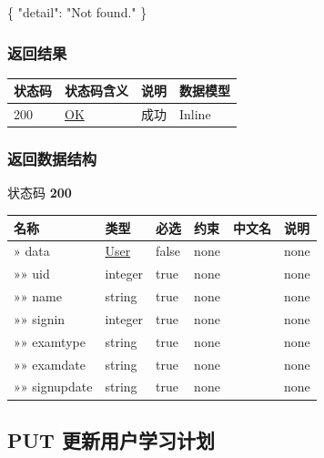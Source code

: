 \documentclass[
]{article}
\newenvironment{Shaded}{}{}
\newcommand{\DataTypeTok}[1]{\textcolor[rgb]{0.56,0.13,0.00}{#1}}
\newcommand{\FunctionTok}[1]{\textcolor[rgb]{0.02,0.16,0.49}{#1}}
\newcommand{\StringTok}[1]{\textcolor[rgb]{0.25,0.44,0.63}{#1}}
\begin{document}
\begin{Shaded}
\begin{Highlighting}[]
\FunctionTok{\{}
  \DataTypeTok{"detail"}\FunctionTok{:} \StringTok{"Not found."}
\FunctionTok{\}}
\end{Highlighting}
\end{Shaded}

\hypertarget{ux8fd4ux56deux7ed3ux679c-26}{%
\subsubsection{返回结果}\label{ux8fd4ux56deux7ed3ux679c-26}}

\begin{longtable}[]{@{}llll@{}}
\toprule
状态码 & 状态码含义 & 说明 & 数据模型 \\
\midrule
\endhead
200 & \href{https://tools.ietf.org/html/rfc7231\#section-6.3.1}{OK} &
成功 & Inline \\
\bottomrule
\end{longtable}

\hypertarget{ux8fd4ux56deux6570ux636eux7ed3ux6784-20}{%
\subsubsection{返回数据结构}\label{ux8fd4ux56deux6570ux636eux7ed3ux6784-20}}

状态码 \textbf{200}

\begin{longtable}[]{@{}llllll@{}}
\toprule
名称 & 类型 & 必选 & 约束 & 中文名 & 说明 \\
\midrule
\endhead
» data & \protect\hyperlink{schemauser}{User} & false & none & & none \\
»» uid & integer & true & none & & none \\
»» name & string & true & none & & none \\
»» signin & integer & true & none & & none \\
»» examtype & string & true & none & & none \\
»» examdate & string & true & none & & none \\
»» signupdate & string & true & none & & none \\
\bottomrule
\end{longtable}

\hypertarget{put-ux66f4ux65b0ux7528ux6237ux5b66ux4e60ux8ba1ux5212}{%
\subsection{PUT
更新用户学习计划}\label{put-ux66f4ux65b0ux7528ux6237ux5b66ux4e60ux8ba1ux5212}}
\end{document}
